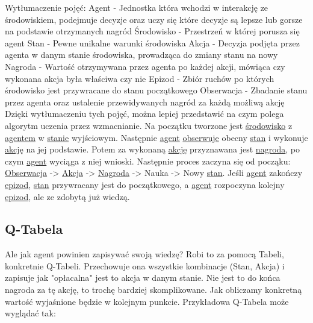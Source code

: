 \documentclass[a4paper,12pt]{article}
\begin{document}
Wytłumaczenie pojęć: \newline
\newline Agent - Jednostka która wchodzi w interakcję ze środowiskiem, podejmuje decyzje oraz uczy się które decyzje są lepsze lub gorsze na podstawie otrzymanych nagród \newline
\newline Środowisko - Przestrzeń w której porusza się agent \newline
\newline Stan - Pewne unikalne warunki środowiska \newline
\newline Akcja - Decyzja podjęta przez agenta w danym stanie środowiska, prowadząca do zmiany stanu na nowy \newline
\newline Nagroda - Wartość otrzymywana przez agenta po każdej akcji, mówiąca czy wykonana akcja była właściwa czy nie \newline
\newline Epizod - Zbiór ruchów po których środowisko jest przywracane do stanu początkowego \newline
\newline Obserwacja - Zbadanie stanu przez agenta oraz ustalenie przewidywanych nagród za każdą możliwą akcję 
\newline \newline Dzięki wytłumaczeniu tych pojęć, można lepiej przedstawić na czym polega algorytm uczenia przez wzmacnianie. Na początku tworzone jest \underline{środowisko} z \underline{agentem} w \underline{stanie} wyjściowym. Następnie \underline{agent} \underline{obserwuje} obecny \underline{stan} i wykonuje \underline{akcję} na jej podstawie. Potem za wykonaną \underline{akcję} przyznawana jest \underline{nagroda}, po czym \underline{agent} wyciąga z niej wnioski. Następnie proces zaczyna się od począku: \underline{Obserwacja} -> \underline{Akcja} -> \underline{Nagroda} -> Nauka -> Nowy \underline{stan}. Jeśli \underline{agent} zakończy \underline{epizod}, \underline{stan} przywracany jest do początkowego, a \underline{agent} rozpoczyna kolejny \underline{epizod}, ale ze zdobytą już wiedzą.

\subsection{Q-Tabela}

Ale jak agent powinien zapisywać swoją wiedzę? Robi to za pomocą Tabeli, konkretnie Q-Tabeli. Przechowuje ona wszystkie kombinacje (Stan, Akcja) i zapisuje jak "opłacalna" jest to akcja w danym stanie. Nie jest to do końca nagroda za tę akcję, to trochę bardziej skomplikowane. Jak obliczamy konkretną wartość wyjaśnione będzie w kolejnym punkcie. Przykładowa Q-Tabela może wyglądać tak: \newline
\end{document}
